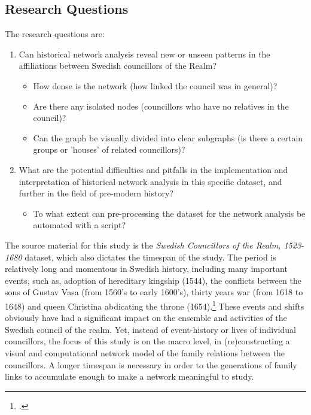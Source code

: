 \subsection{Research Questions}
The research questions are:
\begin{enumerate}
	\item Can historical network analysis reveal new or unseen patterns in the affiliations between Swedish councillors of the Realm? \begin{itemize}
		\item How dense is the network (how linked the council was in general)?
		\item Are there any isolated nodes (councillors who have no relatives in the council)?
		\item Can the graph be visually divided into clear subgraphs (is there a certain groups or 'houses' of related councillors)?
	\end{itemize}	
	\item What are the potential difficulties and pitfalls in the implementation and interpretation of historical network analysis in this specific dataset, and further in the field of pre-modern history? \begin{itemize}	
		\item To what extent can pre-processing the dataset for the network analysis be automated with a script?
	\end{itemize}
\end{enumerate} 

The source material for this study is the \textit{Swedish Councillors of the Realm, 1523-1680} dataset, which also dictates the timespan of the study. The period is relatively long and momentous in Swedish history, including many important events, such as, adoption of hereditary kingship (1544), the conflicts between the sons of Gustav Vasa (from 1560's to early 1600's), thirty years war (from 1618 to 1648) and queen Christina abdicating the throne (1654).\footcite[p. 8-9.]{personalAgency} These events and shifts obviously have had a significant impact on the ensemble and activities of the Swedish council of the realm. Yet, instead of event-history or lives of individual councillors, the focus of this study is on the macro level, in (re)constructing a visual and computational network model of the family relations between the councillors. A longer timespan is necessary in order to the generations of family links to accumulate enough to make a network meaningful to study.

